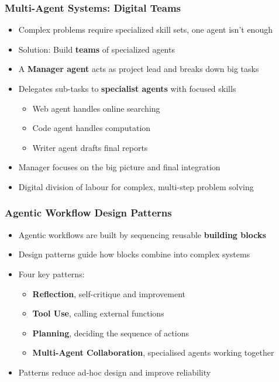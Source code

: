 \begin{frame}[fragile]\frametitle{Multi-Agent Systems: Digital Teams}
      \begin{itemize}
        \item Complex problems require specialized skill sets, one agent isn't enough
        \item Solution: Build \textbf{teams} of specialized agents
        \item A \textbf{Manager agent} acts as project lead and breaks down big tasks
        \item Delegates sub-tasks to \textbf{specialist agents} with focused skills
        \begin{itemize}
            \item Web agent handles online searching
            \item Code agent handles computation
            \item Writer agent drafts final reports
        \end{itemize}
        \item Manager focuses on the big picture and final integration
        \item Digital division of labour for complex, multi-step problem solving
      \end{itemize}
\end{frame}

\begin{frame}[fragile]\frametitle{Agentic Workflow Design Patterns}
      \begin{itemize}
        \item Agentic workflows are built by sequencing reusable \textbf{building blocks}
        \item Design patterns guide how blocks combine into complex systems
        \item Four key patterns:
        \begin{itemize}
            \item \textbf{Reflection}, self-critique and improvement
            \item \textbf{Tool Use}, calling external functions
            \item \textbf{Planning}, deciding the sequence of actions
            \item \textbf{Multi-Agent Collaboration}, specialised agents working together
        \end{itemize}
        \item Patterns reduce ad-hoc design and improve reliability
      \end{itemize}
\end{frame}

